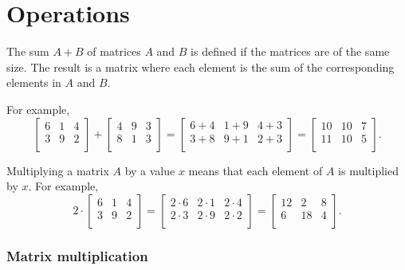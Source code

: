\section{Operations}

The sum $A+B$ of matrices $A$ and $B$
is defined if the matrices are of the same size.
The result is a matrix where each element
is the sum of the corresponding elements
in $A$ and $B$.

For example,
\[
    \begin{bmatrix}
        6 & 1 & 4 \\
        3 & 9 & 2 \\
    \end{bmatrix}
    +
    \begin{bmatrix}
        4 & 9 & 3 \\
        8 & 1 & 3 \\
    \end{bmatrix}
    =
    \begin{bmatrix}
        6+4 & 1+9 & 4+3 \\
        3+8 & 9+1 & 2+3 \\
    \end{bmatrix}
    =
    \begin{bmatrix}
        10 & 10 & 7 \\
        11 & 10 & 5 \\
    \end{bmatrix}.
\]

Multiplying a matrix $A$ by a value $x$ means
that each element of $A$ is multiplied by $x$.
For example,
\[
    2 \cdot \begin{bmatrix}
        6 & 1 & 4 \\
        3 & 9 & 2 \\
    \end{bmatrix}
    =
    \begin{bmatrix}
        2 \cdot 6 & 2\cdot1 & 2\cdot4 \\
        2\cdot3   & 2\cdot9 & 2\cdot2 \\
    \end{bmatrix}
    =
    \begin{bmatrix}
        12 & 2  & 8 \\
        6  & 18 & 4 \\
    \end{bmatrix}.
\]

\subsubsection{Matrix multiplication}

